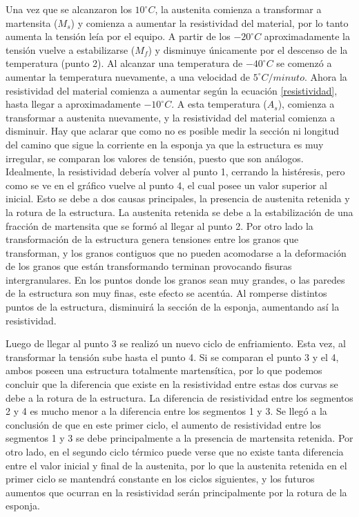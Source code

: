 \documentclass[a4paper,12pt,fleqn,twoside,openany]{book}
\begin{document}
 Una vez que se alcanzaron los $10 ^\circ C$, la austenita comienza a transformar a martensita ($M_s$) y comienza a aumentar la resistividad del material, por lo tanto aumenta la tensión leía por el equipo. A partir de los $-20 ^\circ C$ aproximadamente la tensión vuelve a estabilizarse ($M_f$) y disminuye únicamente por el descenso de la temperatura (punto 2).     
 Al alcanzar una temperatura de $-40 ^\circ C$ se comenzó a aumentar la temperatura nuevamente, a una velocidad de $5 ^\circ C/minuto$. Ahora la resistividad del material comienza a aumentar según la ecuación \ref{resistividad}, hasta llegar a aproximadamente $-10 ^\circ C$. A esta temperatura ($A_s$), comienza a transformar a austenita nuevamente, y la resistividad del material comienza a disminuir. Hay que aclarar que como no es posible medir la sección ni longitud del camino que sigue la corriente en la esponja ya que la estructura es muy irregular, se comparan los valores de tensión, puesto que son análogos. Idealmente, la resistividad debería volver al punto 1, cerrando la histéresis, pero como se ve en el gráfico vuelve al punto 4, el cual posee un valor superior al inicial. Esto se debe a dos causas principales, la presencia de austenita retenida y la rotura de la estructura. La austenita retenida se debe a la estabilización de una fracción de martensita que se formó al llegar al punto 2. Por otro lado la transformación de la estructura genera tensiones entre los granos que transforman, y los granos contiguos que no pueden acomodarse a la deformación de los granos que están transformando terminan provocando fisuras intergranulares. En los puntos donde los granos sean muy grandes, o las paredes de la estructura son muy finas, este efecto se acentúa. Al romperse distintos puntos de la estructura, disminuirá la sección de la esponja, aumentando así la resistividad.

 Luego de llegar al punto 3 se realizó un nuevo ciclo de enfriamiento. Esta vez, al transformar la tensión sube hasta el punto 4. Si se comparan el punto 3 y el 4, ambos poseen una estructura totalmente martensítica, por lo que podemos concluir que la diferencia que existe en la resistividad entre estas dos curvas se debe a la rotura de la estructura. La diferencia de resistividad entre los segmentos 2 y 4 es mucho menor a la diferencia entre los segmentos 1 y 3. Se llegó a la conclusión de que en este primer ciclo, el aumento de resistividad entre los segmentos 1 y 3 se debe principalmente a la presencia de martensita retenida. Por otro lado, en el segundo ciclo térmico puede verse que no existe tanta diferencia entre el valor inicial y final de la austenita, por lo que la austenita retenida en el primer ciclo se mantendrá constante en los ciclos siguientes, y los futuros aumentos que ocurran en la resistividad serán principalmente por la rotura de la esponja. 
 
\end{document}
